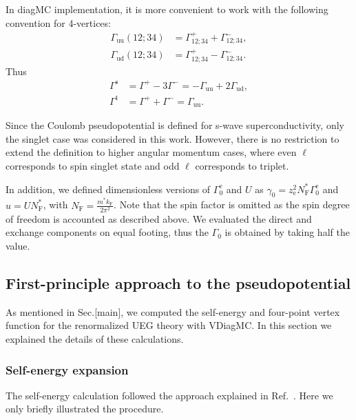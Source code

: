\documentclass[%
 reprint,
superscriptaddress,
 amsmath,amssymb,
 aps,
prx,
]{revtex4-2}
\newcommand{\txe}{\text{e}}
\newcommand{\txs}{\text{s}}
\newcommand{\txt}{\text{t}}
\newcommand{\txF}{\text{F}}
\newcommand{\txuu}{\text{uu}}
\newcommand{\txud}{\text{ud}}
\begin{document}
\begin{appendices}
In diagMC implementation, it is more convenient to work with the following
convention for 4-vertices:
\begin{equation}
  \begin{split}
    \Gamma_{\txuu}(12;34) &= \Gamma^+_{12;34}+\Gamma^-_{12;34}, \\
    \Gamma_{\txud}(12;34) &= \Gamma^+_{12;34}-\Gamma^-_{12;34}.
  \end{split}
\end{equation}
Thus
\begin{equation}
  \begin{split}
    \Gamma^{\txs}&=\Gamma^+-3\Gamma^-=-\Gamma_{\txuu}+2\Gamma_{\txud}, \\
    \Gamma^{\txt}&=\Gamma^++\Gamma^-=\Gamma_{\txuu}.
  \end{split}
\end{equation}

Since the Coulomb pseudopotential is defined for s-wave superconductivity, only the singlet case was considered in this work. However, there is no restriction to extend the definition to higher angular momentum cases, where even $\ell$ corresponds to spin singlet state and odd $\ell$ corresponds to triplet.

In addition, we defined dimensionless versions of $\Gamma^{\txe}_0$ and
$U$ as $\gamma_0 = z_\txe^2N_{\txF}^*\Gamma^{\txe}_0 $ and $u = UN_{\txF}^*$, with $N_{\txF}=\frac{m^*k_{\txF}}{2\pi^2}$.
Note that the spin factor is omitted as the spin degree of freedom is accounted as described above.
We evaluated the direct and exchange components on equal footing, 
thus the $\Gamma_0$ is obtained by taking half the value.

\subsection{First-principle approach to the pseudopotential}

As mentioned in  Sec.[main], we computed the self-energy and four-point vertex function for the renormalized UEG theory with VDiagMC. 
In this section we explained the details of these calculations.

\subsubsection{Self-energy expansion}
The self-energy calculation followed the approach explained in Ref.~\cite{hou_feynman_2024}. Here we only briefly illustrated the procedure.




\end{appendices}
\end{document}
